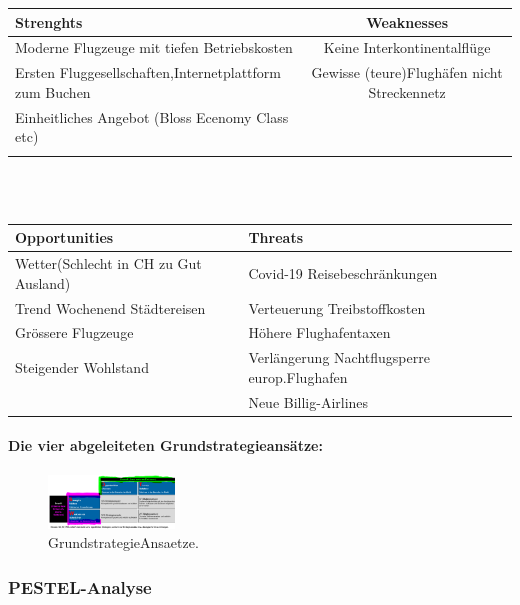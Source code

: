 \documentclass{article}
\begin{document}
\begin{tabular}{|l|c|}
\hline
\rule[-1ex]{0pt}{2.5ex} 
\textbf{Strenghts} & \textbf{Weaknesses} \\ 
\hline 
\rule[-1ex]{0pt}{2.5ex}
Moderne Flugzeuge mit tiefen Betriebskosten & Keine Interkontinentalflüge \\ 
\hline 
\rule[-1ex]{0pt}{2.5ex}
Ersten Fluggesellschaften,Internetplattform zum Buchen & Gewisse (teure)Flughäfen  nicht Streckennetz \\ 
\hline
\rule[-1ex]{0pt}{2.5ex} 
Einheitliches Angebot (Bloss Ecenomy Class etc) &  \\ 
\hline
\rule[-1ex]{0pt}{2.5ex}
\end{tabular} \\ \\


\begin{tabular}{|l|l|}
\hline 
\rule[-1ex]{0pt}{2.5ex}
\textbf{Opportunities} & \textbf{Threats} \\ 
\hline 
\rule[-1ex]{0pt}{2.5ex} Wetter(Schlecht in CH zu Gut Ausland) & Covid-19 Reisebeschränkungen \\ 
\hline 
\rule[-1ex]{0pt}{2.5ex} Trend Wochenend Städtereisen & Verteuerung Treibstoffkosten \\ 
\hline 
\rule[-1ex]{0pt}{2.5ex} Grössere Flugzeuge & Höhere Flughafentaxen \\ 
\hline 
\rule[-1ex]{0pt}{2.5ex} Steigender Wohlstand & Verlängerung Nachtflugsperre europ.Flughafen \\ 
\hline 
\rule[-1ex]{0pt}{2.5ex}  & Neue Billig-Airlines \\ 
\hline 
\end{tabular} 


\paragraph{Die vier abgeleiteten Grundstrategieansätze: \\}
\begin{figure}[H]
\centering
\includegraphics[width=0.3\textwidth]{Resources/Image/GrundstrategieAnsaetze.png}
\caption{\label{fig:GrundstrategieAnsaetze}GrundstrategieAnsaetze.}
\end{figure}


\subsubsection{PESTEL-Analyse}
\end{document}
